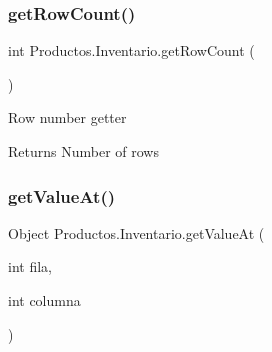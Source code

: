 \subsubsection{\texorpdfstring{get\+Row\+Count()}{getRowCount()}}
{\footnotesize\ttfamily int Productos.\+Inventario.\+get\+Row\+Count (\begin{DoxyParamCaption}{ }\end{DoxyParamCaption})}

Row number getter \begin{DoxyReturn}{Returns}
Number of rows 
\end{DoxyReturn}
\mbox{\label{class_productos_1_1_inventario_a79bccc9036dee4d92518ea4b21b3de3d}} 
\subsubsection{\texorpdfstring{get\+Value\+At()}{getValueAt()}}
{\footnotesize\ttfamily Object Productos.\+Inventario.\+get\+Value\+At (\begin{DoxyParamCaption}\item[{int}]{fila,  }\item[{int}]{columna }\end{DoxyParamCaption})}

